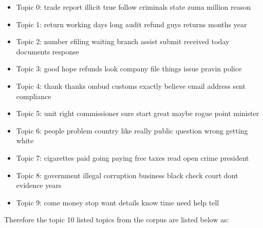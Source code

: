 \begin{itemize}
    \item Topic 0: trade report illicit true follow criminals state zuma million reason
\end{itemize}
\begin{itemize}
    \item Topic 1: return working days long audit refund guys returns months year
\end{itemize}
\begin{itemize}
    \item Topic 2: number efiling waiting branch assist submit received today documents response
\end{itemize}
\begin{itemize}
    \item Topic 3: good hope refunds look company file things issue pravin police
\end{itemize}
\begin{itemize}
    \item Topic 4: thank thanks ombud customs exactly believe email address sent compliance
\end{itemize}
\begin{itemize}
    \item Topic 5: unit right commissioner sure start great maybe rogue point minister
\end{itemize}
\begin{itemize}
    \item Topic 6: people problem country like really public question wrong getting white
\end{itemize}
\begin{itemize}
    \item Topic 7: cigarettes paid going paying free taxes read open crime president
\end{itemize}
\begin{itemize}
    \item Topic 8: government illegal corruption business black check court dont evidence years
\end{itemize}
\begin{itemize}
    \item Topic 9: come money stop want details know time need help tell
\end{itemize}

Therefore the topic 10 listed topics from the corpus are listed below as:

